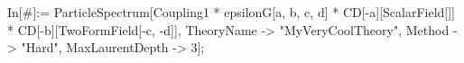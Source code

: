 In[#]:= ParticleSpectrum[Coupling1 * epsilonG[a, b, c, d] * CD[-a][ScalarField[]] * CD[-b][TwoFormField[-c, -d]], TheoryName -> "MyVeryCoolTheory", Method -> "Hard", MaxLaurentDepth -> 3]; 